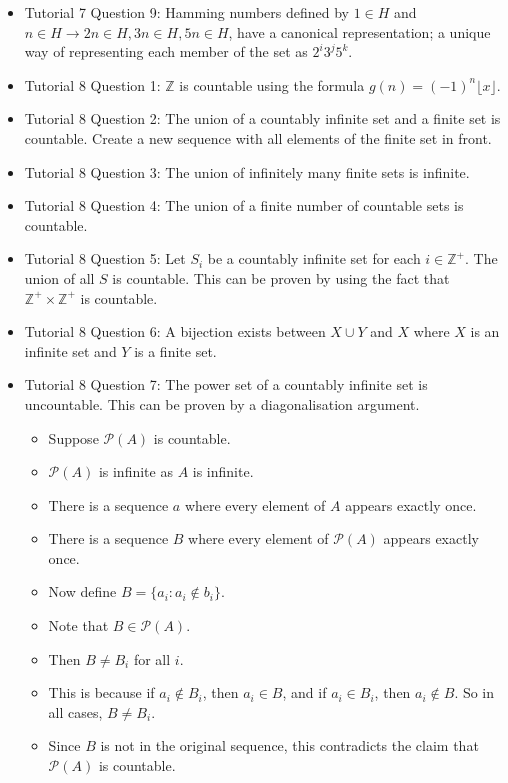 \documentclass[10pt, portrait]{article}
\begin{document}
\begin{multicols*}{2}
\begin{itemize}
    \item Tutorial 7 Question 9: Hamming numbers defined by $1 \in H$ and $n \in H \rightarrow 2n \in H, 3n \in H, 5n \in H$, have a canonical representation; a unique way of representing each member of the set as $2^i3^j5^k$.
    \item Tutorial 8 Question 1: $\mathbb{Z}$ is countable using the formula $g(n)=(-1)^n \lfloor x \rfloor$.
    \item Tutorial 8 Question 2: The union of a countably infinite set and a finite set is countable. Create a new sequence with all elements of the finite set in front.
    \item Tutorial 8 Question 3: The union of infinitely many finite sets is infinite.
    \item Tutorial 8 Question 4: The union of a finite number of countable sets is countable.
    \item Tutorial 8 Question 5: Let $S_i$ be a countably infinite set for each $i \in \mathbb{Z}^+$. The union of all $S$ is countable. This can be proven by using the fact that $\mathbb{Z}^+ \times \mathbb{Z}^+$ is countable.
    \item Tutorial 8 Question 6: A bijection exists between $X \cup Y$ and $X$ where $X$ is an infinite set and $Y$ is a finite set.
    \item Tutorial 8 Question 7: The power set of a countably infinite set is uncountable. This can be proven by a diagonalisation argument.
    \begin{itemize}
        \item Suppose $\mathcal{P}(A)$ is countable.
        \item $\mathcal{P}(A)$ is infinite as $A$ is infinite.
        \item There is a sequence $a$ where every element of $A$ appears exactly once.
        \item There is a sequence $B$ where every element of $\mathcal{P}(A)$ appears exactly once.
        \item Now define $B=\{a_i:a_i \notin b_i\}$.
        \item Note that $B\in\mathcal{P}(A)$.
        \item Then $B\neq B_i$ for all $i$.
        \item This is because if $a_i\notin B_i$, then $a_i\in B$, and if $a_i\in B_i$, then $a_i \notin B$. So in all cases, $B\neq B_i$.
        \item Since $B$ is not in the original sequence, this contradicts the claim that $\mathcal{P}(A)$ is countable.

\end{itemize}
\end{itemize}
\end{multicols*}
\end{document}

